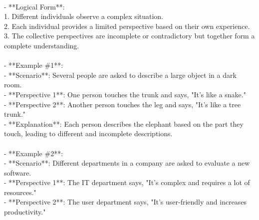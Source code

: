 \documentclass[a4paper,12pt,single,pdftex]{scrartcl}
\begin{document}
    
      
    \\

    
      - **Logical Form**:
    \\

    
        1. Different individuals observe a complex situation.
    \\

    
        2. Each individual provides a limited perspective based on their own experience.
    \\

    
        3. The collective perspectives are incomplete or contradictory but together form a complete understanding.
    \\

    
      
    \\

    
      - **Example \#1**:
    \\

    
        - **Scenario**: Several people are asked to describe a large object in a dark room.
    \\

    
        - **Perspective 1**: One person touches the trunk and says, "It's like a snake."
    \\

    
        - **Perspective 2**: Another person touches the leg and says, "It's like a tree trunk."
    \\

    
        - **Explanation**: Each person describes the elephant based on the part they touch, leading to different and incomplete descriptions.
    \\

    
      
    \\

    
      - **Example \#2**:
    \\

    
        - **Scenario**: Different departments in a company are asked to evaluate a new software.
    \\

    
        - **Perspective 1**: The IT department says, "It's complex and requires a lot of resources."
    \\

    
        - **Perspective 2**: The user department says, "It's user-friendly and increases productivity."
    \\
\end{document}
